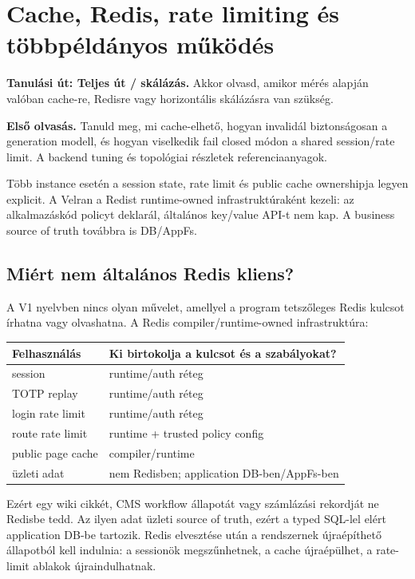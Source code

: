 \chapter{Cache, Redis, rate limiting és többpéldányos működés}

\noindent\textbf{Tanulási út: Teljes út / skálázás.} Akkor olvasd, amikor mérés alapján valóban cache-re, Redisre vagy horizontális skálázásra van szükség.\par\medskip

\noindent\textbf{Első olvasás.} Tanuld meg, mi cache-elhető, hogyan invalidál biztonságosan a generation modell, és hogyan viselkedik fail closed módon a shared session/rate limit. A backend tuning és topológiai részletek referenciaanyagok.\par\medskip

Több instance esetén a session state, rate limit és public cache ownershipja legyen explicit. A Velran a Redist runtime-owned infrastruktúraként kezeli: az alkalmazáskód policyt deklarál, általános key/value API-t nem kap. A business source of truth továbbra is DB/AppFs.

\section{Miért nem általános Redis kliens?}

A V1 nyelvben nincs olyan művelet, amellyel a program tetszőleges Redis kulcsot írhatna vagy olvashatna. A Redis compiler/runtime-owned infrastruktúra:

\begin{center}
\begin{tabularx}{\textwidth}{@{}L{0.27\textwidth}Y@{}}
\toprule
\textbf{Felhasználás} & \textbf{Ki birtokolja a kulcsot és a szabályokat?} \\
\midrule
session & runtime/auth réteg \\
TOTP replay & runtime/auth réteg \\
login rate limit & runtime/auth réteg \\
route rate limit & runtime + trusted policy config \\
public page cache & compiler/runtime \\
üzleti adat & nem Redisben; application DB-ben/AppFs-ben \\
\bottomrule
\end{tabularx}
\end{center}

Ezért egy wiki cikkét, CMS workflow állapotát vagy számlázási rekordját ne Redisbe tedd. Az ilyen adat üzleti source of truth, ezért a typed SQL-lel elért application DB-be tartozik. Redis elvesztése után a rendszernek újraépíthető állapotból kell indulnia: a sessionök megszűnhetnek, a cache újraépülhet, a rate-limit ablakok újraindulhatnak.

